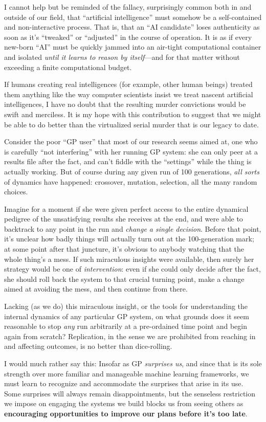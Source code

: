 I cannot help but be reminded of the fallacy, surprisingly common both in and outside of our field, that ``artificial intelligence'' must somehow be a self-contained and non-interactive process. That is, that an ``AI candidate'' loses  authenticity as soon as it's ``tweaked'' or ``adjusted'' in the course of operation. It is as if every new-born ``AI'' must be quickly jammed into an air-tight computational container and isolated \emph{until it learns to reason by itself}---and for that matter without exceeding a finite computational budget.

If humans creating real intelligences (for example, other human beings) treated them anything like the way computer scientists insist we treat nascent artificial intelligences, I have no doubt that the resulting murder convictions would be swift and merciless. It is my hope with this contribution to suggest that we might be able to do better than the virtualized serial murder that is our legacy to date.

Consider the poor ``GP user'' that most of our research seems aimed at, one who is carefully ``not interfering'' with her running GP system: she can only peer at a results file after the fact, and can't fiddle with the ``settings'' while the thing is actually working. But of course during any given run of 100 generations, \emph{all sorts} of dynamics have happened: crossover, mutation, selection, all the many random choices.

Imagine for a moment if she were given perfect access to the entire dynamical pedigree of the unsatisfying results she receives at the end, and were able to backtrack to any point in the run and \emph{change a single decision}. Before that point, it's unclear how badly things will actually turn out at the 100-generation mark; at some point after that juncture, it's obvious to anybody watching that the whole thing's a mess. If such miraculous insights were available, then surely her strategy would be one of \emph{intervention}: even if she could only decide after the fact, she should roll back the system to that crucial turning point, make a change aimed at avoiding the mess, and then continue from there.

Lacking (as we do) this miraculous insight, or the tools for understanding the internal dynamics of any particular GP system, on what grounds does it seem reasonable to stop \emph{any} run arbitrarily at a pre-ordained time point and begin again from scratch? Replication, in the sense we are prohibited from reaching in and affecting outcomes, is no better than dice-rolling.

I would much rather say this: Insofar as GP \emph{surprises us}, and since that is its sole strength over more familiar and manageable machine learning frameworks, we must learn to recognize and accommodate the surprises that arise in its use. Some surprises will always remain disappointments, but the senseless restriction we impose on engaging the systems we build blocks us from seeing others as \textbf{encouraging opportunities to improve our plans before it's too late}.

